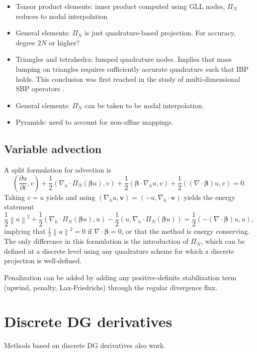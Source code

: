\documentclass[preprint,10pt]{article}
\theoremstyle{definition}
\theoremstyle{lemma}
\newcommand{\pd}[2]{\frac{\partial#1}{\partial#2}}
\newcommand{\nor}[1]{\left\| #1 \right\|}
\newcommand{\LRp}[1]{\left( #1 \right)}
\newcommand{\Grad} {\ensuremath{\nabla}}
\begin{document}
\begin{itemize}
\item Tensor product elements: inner product computed using GLL nodes, $\Pi_N$ reduces to nodal interpolation
\item General elements: $\Pi_N$ is just quadrature-based projection.  For accuracy, degree $2N$ or higher?  
\item Triangles and tetrahedra: lumped quadrature nodes.  Implies that mass lumping on triangles requires sufficiently accurate quadrature such that IBP holds.  This conclusion was first reached in the study of multi-dimensional SBP operators \cite{hicken2016multidimensional}.  
\item General elements: $\Pi_N$ can be taken to be nodal interpolation.  
\item Pyramids: need to account for non-affine mappings.  
\end{itemize}

\subsection{Variable advection}

A split formulation for advection is 
\[
\LRp{\pd{u}{t},v} + \frac{1}{2}\LRp{\Grad_h\cdot \Pi_N \LRp{ \bm{\beta}u},v} + \frac{1}{2}\LRp{\bm{\beta}\cdot\Grad_h u,v} + \frac{1}{2}\LRp{\LRp{\Grad\cdot \bm{\beta}} u,v} = 0.
\]
Taking $v = u$ yields and using $\LRp{\Grad_h u, \bm{v}} = \LRp{-u, \Grad_h \cdot \bm{v}}$ yields the energy statement
\[
\frac{1}{2}\nor{u}^2 + \frac{1}{2}\LRp{\Grad_h\cdot \Pi_N \LRp{ \bm{\beta}u},u} - \frac{1}{2}\LRp{ u, \Grad_h\cdot \Pi_N\LRp{\bm{\beta}u}} = \frac{1}{2}\LRp{-\LRp{\Grad \cdot \bm{\beta}} u,u},
\]
implying that $\frac{1}{2}\nor{u}^2 = 0$ if $\Grad\cdot \bm{\beta} = 0$, or that the method is energy conserving.  The only difference in this formulation is the introduction of $\Pi_N$, which can be defined at a discrete level using any quadrature scheme for which a discrete projection is well-defined. 

Penalization can be added by adding any positive-definite stabilization term (upwind, penalty, Lax-Friedrichs) through the regular divergence flux.  

\section{Discrete DG derivatives}

Methods based on discrete DG derivatives also work.  
\end{document}
